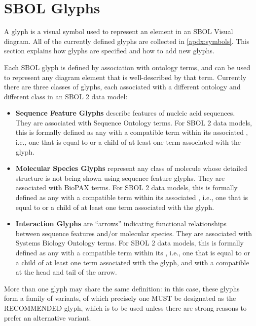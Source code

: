 \section{SBOL Glyphs}\label{sec:glyphs}

A glyph is a visual symbol used to represent an element in an SBOL Visual diagram.
All of the currently defined glyphs are collected in \ref{apdx:symbols}.
%
This section explains how glyphs are specified and how to add new glyphs.

Each SBOL glyph is defined by association with ontology terms, and can be used to represent any diagram element that is well-described by that term.
Currently there are three classes of glyphs, each associated with a different ontology and different class in an SBOL 2 data model:
\begin{itemize}
\item {\bf Sequence Feature Glyphs} describe features of nucleic acid sequences. They are associated with Sequence Ontology terms.
For SBOL 2 data models, this is formally defined as any  with a compatible term within its associated ,
 i.e., one that is equal to or a child of at least one term associated with the glyph.
\item {\bf Molecular Species Glyphs} represent any class of molecule whose detailed structure is not being shown using sequence feature glyphs. They are associated with BioPAX terms.  For SBOL 2 data models, this is formally defined as any  with a compatible term within its associated ,
 i.e., one that is equal to or a child of at least one term associated with the glyph.
\item {\bf Interaction Glyphs} are ``arrows'' indicating functional relationships between sequence features and/or molecular species. They are associated with Systems Biology Ontology terms.
For SBOL 2 data models, this is formally defined as any  with a compatible term within its ,
 i.e., one that is equal to or a child of at least one term associated with the glyph, 
 and with a compatible  at the head and tail of the arrow.
 \end{itemize}
 
More than one glyph may share the same definition: in this case, these glyphs form a family of variants, of which precisely one MUST be designated as the RECOMMENDED glyph, which is to be used unless there are strong reasons to prefer an alternative variant.

